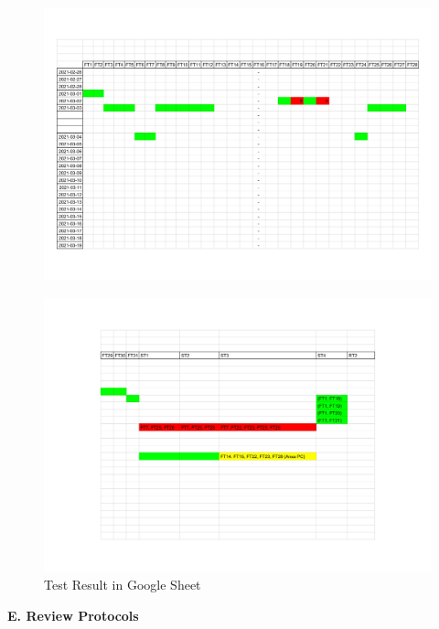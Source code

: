 \documentclass{article}
\begin{document}
 \begin{figure}
     \centering
     \includegraphics[width=19cm, left]{images/Testresultat TimeMate 1}
     \renewcommand\figurename{Figure}
     \label{fig:my_label}
 \end{figure}
 
  \begin{figure}
     \centering
     \includegraphics[width=19cm, left]{images/Testresultat TimeMate 2}
     \renewcommand\figurename{Figure}
     \caption{Test Result in Google Sheet}
     \label{fig:my_label}
 \end{figure}


\newpage
\begin{flushleft}
{\large \textbf{E. Review Protocols}}
\end{flushleft}
\end{document}
